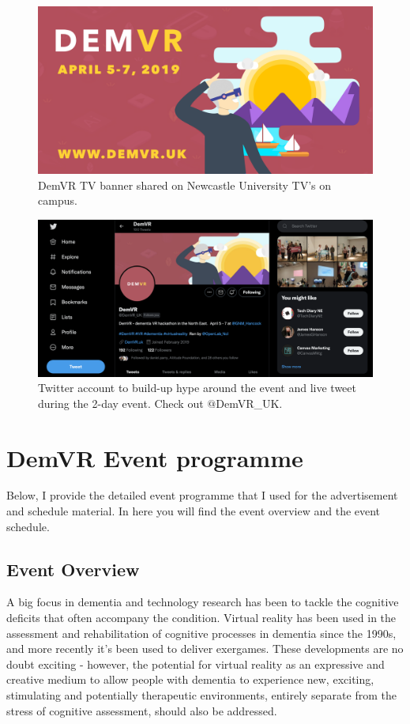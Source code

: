 \begin{figure}[htp]
    \centering
    \includegraphics[width=0.8\linewidth]{Images/Appendix/DemVR appendix/Banner.png}
    \caption{DemVR TV banner shared on Newcastle University TV's on campus.}
    \label{fig:App:TV-Banner}
\end{figure}

\begin{figure}[htp]
    \centering
\includegraphics[width=0.8\linewidth]{Images/Appendix/DemVR appendix/DemVR_Twitter.png}
    \caption{Twitter account to build-up hype around the event and live tweet during the 2-day event. Check out $@$DemVR\_UK. }
    \label{fig:App:Twitter}
\end{figure}

\newpage
\section{DemVR Event programme}
\label{app:DemVREvent}
Below, I provide the detailed event programme that I used for the advertisement and schedule material. In here you will find the event overview and the event schedule. 

\subsection{Event Overview}
\label{app:DemVR:Overview}
A big focus in dementia and technology research has been to tackle the cognitive deficits that often accompany the condition. Virtual reality has been used in the assessment and rehabilitation of cognitive processes in dementia since the 1990s, and more recently it's been used to deliver exergames. These developments are no doubt exciting - however, the potential for virtual reality as an expressive and creative medium to allow people with dementia to experience new, exciting, stimulating and potentially therapeutic environments, entirely separate from the stress of cognitive assessment, should also be addressed.

